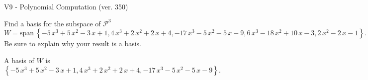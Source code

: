 \begin{exercise}
  \begin{exerciseTitle}V9 - Polynomial Computation (ver. 350)\end{exerciseTitle}
  \begin{exerciseStatement}
    Find a basis for the subspace of \(\mathcal{P}^3\) 
\[W=\mathrm{span}\ \left\{-5 \, x^{3} + 5 \, x^{2} - 3 \, x + 1 , 4 \, x^{3} + 2 \, x^{2} + 2 \, x + 4 , -17 \, x^{3} - 5 \, x^{2} - 5 \, x - 9 , 6 \, x^{3} - 18 \, x^{2} + 10 \, x - 3 , 2 \, x^{2} - 2 \, x - 1\right\}.\]
 Be sure to explain why your result is a basis.


  \end{exerciseStatement}
  \begin{exerciseAnswer}
   A basis of \(W\) is  \(\left\{-5 \, x^{3} + 5 \, x^{2} - 3 \, x + 1 , 4 \, x^{3} + 2 \, x^{2} + 2 \, x + 4 , -17 \, x^{3} - 5 \, x^{2} - 5 \, x - 9\right\}\).
  


  \end{exerciseAnswer}
\end{exercise}
